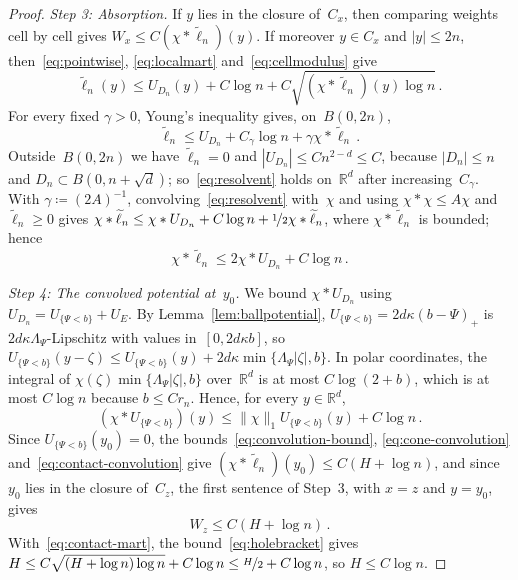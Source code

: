 \documentclass[11pt]{amsart}
\theoremstyle{plain}
\theoremstyle{definition}
\newcommand{\R}{\mathbb R}
\newcommand{\drift}{\kappa}
\newcommand{\gauge}{\Psi}
\newcommand{\nf}{\nicefrac}
\numberwithin{equation}{section}
\begin{document}
\begin{proof}
\emph{Step 3: Absorption.} If $y$ lies in the closure of~$C_x$, then comparing weights cell by cell gives $W_x\leq C(\chi*\widetilde\ell_n)(y)$. If moreover $y\in C_x$ and $|y|\leq2n$, then~\eqref{eq:pointwise}, \eqref{eq:localmart} and~\eqref{eq:cellmodulus} give
\begin{equation*}
\widetilde\ell_n(y)\leq U_{D_n}(y)+C\log n+C\sqrt{(\chi*\widetilde\ell_n)(y)\log n}\, .
\end{equation*}
For every fixed $\gamma>0$, Young's inequality gives, on~$B(0,2n)$,
\begin{equation}\label{eq:resolvent}
\widetilde\ell_n\leq U_{D_n}+C_\gamma\log n+\gamma\chi*\widetilde\ell_n\, .
\end{equation}
Outside~$B(0,2n)$ we have $\widetilde\ell_n=0$ and $|U_{D_n}|\leq Cn^{2-d}\leq C$, because $|D_n|\leq n$ and $D_n\subset B(0,n+\sqrt d)$; so~\eqref{eq:resolvent} holds on~$\R^d$ after increasing~$C_\gamma$. With $\gamma\coloneqq(2A)^{-1}$, convolving~\eqref{eq:resolvent} with~$\chi$ and using $\chi*\chi\leq A\chi$ and $\widetilde\ell_n\geq0$ gives $\chi*\widetilde\ell_n\leq\chi*U_{D_n}+C\log n+\nf12\chi*\widetilde\ell_n$, where $\chi*\widetilde\ell_n$ is bounded; hence
\begin{equation}\label{eq:convolution-bound}
\chi*\widetilde\ell_n\leq2\chi*U_{D_n}+C\log n\, .
\end{equation}

\emph{Step 4: The convolved potential at~$y_0$.} We bound $\chi*U_{D_n}$ using $U_{D_n}=U_{\{\gauge<b\}}+U_E$. By Lemma~\ref{lem:ballpotential}, $U_{\{\gauge<b\}}=2d\drift(b-\gauge)_+$ is $2d\drift\Lambda_\gauge$-Lipschitz with values in~$[0,2d\drift b]$, so $U_{\{\gauge<b\}}(y-\zeta)\leq U_{\{\gauge<b\}}(y)+2d\drift\min\{\Lambda_\gauge|\zeta|,b\}$. In polar coordinates, the integral of $\chi(\zeta)\min\{\Lambda_\gauge|\zeta|,b\}$ over~$\R^d$ is at most $C\log(2+b)$, which is at most $C\log n$ because $b\leq Cr_n$. Hence, for every $y\in\R^d$,
\begin{equation}\label{eq:cone-convolution}
(\chi*U_{\{\gauge<b\}})(y)\leq\|\chi\|_1U_{\{\gauge<b\}}(y)+C\log n\, .
\end{equation}
Since $U_{\{\gauge<b\}}(y_0)=0$, the bounds~\eqref{eq:convolution-bound}, \eqref{eq:cone-convolution} and~\eqref{eq:contact-convolution} give $(\chi*\widetilde\ell_n)(y_0)\leq C(H+\log n)$, and since $y_0$ lies in the closure of~$C_z$, the first sentence of Step~3, with $x=z$ and $y=y_0$, gives
\begin{equation}\label{eq:holebracket}
W_z\leq C(H+\log n)\, .
\end{equation}
With~\eqref{eq:contact-mart}, the bound~\eqref{eq:holebracket} gives $H\leq C\sqrt{(H+\log n)\log n}+C\log n\leq\nf{H}{2}+C\log n$, so $H\leq C\log n$.
\end{proof}
\end{document}
